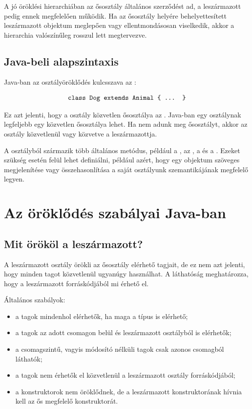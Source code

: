 A jó öröklési hierarchiában az ősosztály általános szerződést ad, a leszármazott pedig ennek megfelelően működik. Ha az ősosztály helyére behelyettesített leszármazott objektum meglepően vagy ellentmondásosan viselkedik, akkor a hierarchia valószínűleg rosszul lett megtervezve.

\subsection{Java-beli alapszintaxis}

Java-ban az osztályöröklődés kulcsszava az :

\[
  \texttt{class Dog extends Animal \{ ... \}}
\]

Ez azt jelenti, hogy a  osztály közvetlen ősosztálya az . Java-ban egy osztálynak legfeljebb egy közvetlen ősosztálya lehet. Ha nem adunk meg ősosztályt, akkor az osztály közvetlenül vagy közvetve a  leszármazottja.

A  osztályból származik több általános metódus, például a , az , a  és a . Ezeket szükség esetén felül lehet definiálni, például azért, hogy egy objektum szöveges megjelenítése vagy összehasonlítása a saját osztályunk szemantikájának megfelelő legyen.

\section{Az öröklődés szabályai Java-ban}

\subsection{Mit örököl a leszármazott?}

A leszármazott osztály örökli az ősosztály elérhető tagjait, de ez nem azt jelenti, hogy minden tagot közvetlenül ugyanúgy használhat. A láthatóság meghatározza, hogy a leszármazott forráskódjából mi érhető el.

Általános szabályok:

\begin{itemize}
  \item a  tagok mindenhol elérhetők, ha maga a típus is elérhető;
  \item a  tagok az adott csomagon belül és leszármazott osztályból is elérhetők;
  \item a csomagszintű, vagyis módosító nélküli tagok csak azonos csomagból láthatók;
  \item a  tagok nem érhetők el közvetlenül a leszármazott osztály forráskódjából;
  \item a konstruktorok nem öröklődnek, de a leszármazott konstruktorának hívnia kell az ős megfelelő konstruktorát.
\end{itemize}

